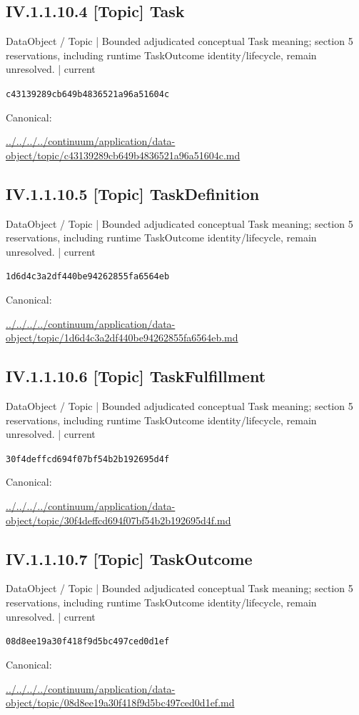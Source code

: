 \documentclass[10pt,a4paper]{article}
\begin{document}
\subsection*{IV.1.1.10.4 [Topic] Task}
{\small DataObject / Topic | Bounded adjudicated conceptual Task meaning; section 5 reservations, including runtime TaskOutcome identity/lifecycle, remain unresolved. | current}\par
\texttt{c43139289cb649b4836521a96a51604c}\par
Canonical: \par
{\footnotesize\url{../../../../continuum/application/data-object/topic/c43139289cb649b4836521a96a51604c.md}}\par
\subsection*{IV.1.1.10.5 [Topic] TaskDefinition}
{\small DataObject / Topic | Bounded adjudicated conceptual Task meaning; section 5 reservations, including runtime TaskOutcome identity/lifecycle, remain unresolved. | current}\par
\texttt{1d6d4c3a2df440be94262855fa6564eb}\par
Canonical: \par
{\footnotesize\url{../../../../continuum/application/data-object/topic/1d6d4c3a2df440be94262855fa6564eb.md}}\par
\subsection*{IV.1.1.10.6 [Topic] TaskFulfillment}
{\small DataObject / Topic | Bounded adjudicated conceptual Task meaning; section 5 reservations, including runtime TaskOutcome identity/lifecycle, remain unresolved. | current}\par
\texttt{30f4deffcd694f07bf54b2b192695d4f}\par
Canonical: \par
{\footnotesize\url{../../../../continuum/application/data-object/topic/30f4deffcd694f07bf54b2b192695d4f.md}}\par
\subsection*{IV.1.1.10.7 [Topic] TaskOutcome}
{\small DataObject / Topic | Bounded adjudicated conceptual Task meaning; section 5 reservations, including runtime TaskOutcome identity/lifecycle, remain unresolved. | current}\par
\texttt{08d8ee19a30f418f9d5bc497ced0d1ef}\par
Canonical: \par
{\footnotesize\url{../../../../continuum/application/data-object/topic/08d8ee19a30f418f9d5bc497ced0d1ef.md}}\par
\end{document}
